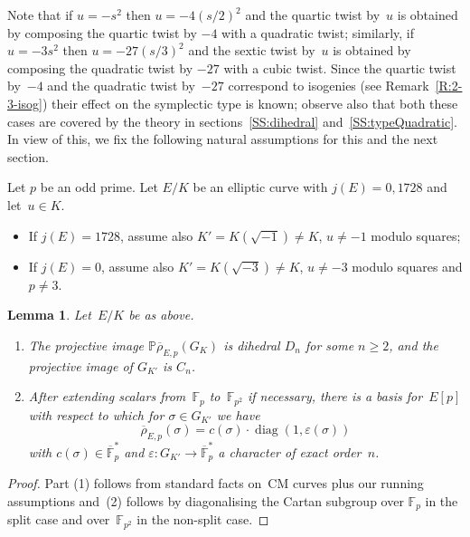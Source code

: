 \documentclass[twoside,leqno,symbols-for-thanks, draft]{rmi}
\numberwithin{equation}{section}
\newcommand{\F}{\mathbb{F}}
\newcommand{\Fp}{\mathbb{F}_p}
\newcommand{\PP}{\mathbb{P}}
\newcommand{\rhobar}{{\overline{\rho}}}
\newcommand{\eps}{\varepsilon}
\newcommand{\diag}{{\operatorname{diag}}}
\newtheorem{lemma}[theorem]{Lemma}
\theoremstyle{remark}
\begin{document}
Note that if $u = -s^2$ then $u = -4(s/2)^2$ and the quartic twist
by~$u$ is obtained by composing the quartic twist by $-4$ with a
quadratic twist; similarly, if $u = -3s^2$ then $u = -27(s/3)^2$ and
the sextic twist by~$u$ is obtained by composing the quadratic twist
by $-27$ with a cubic twist. Since the quartic twist by~$-4$ and the
quadratic twist by~$-27$ correspond to isogenies (see
Remark~\ref{R:2-3-isog}) their effect on the symplectic type is
known; observe also that both these cases are covered by the theory in
sections~\ref{SS:dihedral} and~\ref{SS:typeQuadratic}.  In view of
this, we fix the following natural assumptions for this and the next
section.

Let $p$ be an odd prime. 
Let $E/K$ be an elliptic curve 
with $j(E) = 0, 1728$ and let~$u \in K$.
\begin{itemize}
 \item If $j(E) = 1728$, assume also $K'=K(\sqrt{-1}) \neq K$, 
 $u \neq -1$ modulo squares;
 \item If $j(E) = 0$, assume also $K'=K(\sqrt{-3}) \neq K$, 
 $u \neq -3$ modulo squares and
$p\not=3$. 
\end{itemize}

\begin{lemma} \label{L:diagonalC}
Let~$E/K$ be as above. 
\begin{enumerate}
  \item
The projective image $\PP\rhobar_{E,p}(G_K)$ is dihedral $D_n$ for
some $n\ge2$, and the projective image of $G_{K'}$ is $C_n$.
\item
After extending scalars from~$\Fp$ to~$\F_{p^2}$ if necessary, there
is a basis for~$E[p]$ with respect to which for $\sigma\in G_{K'}$ we
have
\begin{equation}
 \label{E:diagonalC}
\rhobar_{E,p}(\sigma) = c(\sigma)\cdot\diag(1,\eps(\sigma))
\end{equation}
with $c(\sigma)\in\overline{\F}_p^*$ and
$\eps:G_{K'}\to\overline{\F}_p^*$ a character of exact order~$n$.
\end{enumerate}
\end{lemma}
\begin{proof}
Part (1) follows from standard facts on~CM curves plus our running
assumptions and~(2) follows by diagonalising the Cartan subgroup over $\Fp$ in
  the split case and over~$\F_{p^2}$ in the non-split case.
\end{proof}
\end{document}
